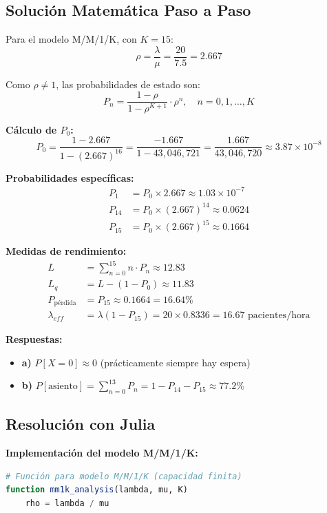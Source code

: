 \documentclass[12pt, a4paper, oneside]{book}
\theoremstyle{definition}
\begin{document}
\begin{center}
\begin{center}
\subsection{Solución Matemática Paso a Paso}

Para el modelo M/M/1/K, con $K = 15$:
$$\rho = \frac{\lambda}{\mu} = \frac{20}{7.5} = 2.667$$

Como $\rho \neq 1$, las probabilidades de estado son:
$$P_n = \frac{1-\rho}{1-\rho^{K+1}} \cdot \rho^n, \quad n = 0, 1, \ldots, K$$

\textbf{Cálculo de $P_0$:}
$$P_0 = \frac{1-2.667}{1-(2.667)^{16}} = \frac{-1.667}{1-43,046,721} = \frac{1.667}{43,046,720} \approx 3.87 \times 10^{-8}$$

\textbf{Probabilidades específicas:}
\begin{align*}
P_1 &= P_0 \times 2.667 \approx 1.03 \times 10^{-7} \\
P_{14} &= P_0 \times (2.667)^{14} \approx 0.0624 \\
P_{15} &= P_0 \times (2.667)^{15} \approx 0.1664
\end{align*}

\textbf{Medidas de rendimiento:}
\begin{align*}
L &= \sum_{n=0}^{15} n \cdot P_n \approx 12.83 \\
L_q &= L - (1-P_0) \approx 11.83 \\
P_{\text{pérdida}} &= P_{15} \approx 0.1664 = 16.64\% \\
\lambda_{eff} &= \lambda(1-P_{15}) = 20 \times 0.8336 = 16.67 \text{ pacientes/hora}
\end{align*}

\textbf{Respuestas:}
\begin{itemize}
\item \textbf{a)} $P[X=0] \approx 0$ (prácticamente siempre hay espera)
\item \textbf{b)} $P[\text{asiento}] = \sum_{n=0}^{13} P_n = 1 - P_{14} - P_{15} \approx 77.2\%$
\end{itemize}

\subsection{Resolución con Julia}

\textbf{Implementación del modelo M/M/1/K:}

\begin{lstlisting}[language=Julia]
# Función para modelo M/M/1/K (capacidad finita)
function mm1k_analysis(lambda, mu, K)
    rho = lambda / mu
    

\end{lstlisting}
\end{center}
\end{center}
\end{document}
